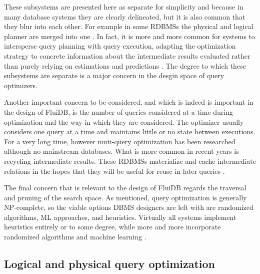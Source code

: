 These subsystems are presented here as separate for simplicity and
because in many database systems they are clearly delineated, but it is
also common that they blur into each other. For example in some RDBMSs
the physical and logical planner are merged into one
\cite{graefeCascadesFrameworkQuery1995,shankarQueryOptimizationMicrosoft2012,solimanOrcaModularQuery2014}. In
fact, it is more and more common for systems to intersperse query
planning with query execution, adapting the optimization strategy
\cite{graefeDynamicQueryEvaluation1989} to concrete information about
the intermediate results evaluated rather than purely relying on
estimations and predictions
\cite{dingPlanStitchHarnessing2018,chaudhuriPayasyougoFrameworkQuery2008,wuSamplingbasedQueryReoptimization2016,herodotouXplusSqltuningawareQuery2010}. The
degree to which these subsystems are separate is a major concern in
the desgin space of query optimizers.

Another important concern to be considered, and which is indeed is
important in the design of FluiDB, is the number of queries considered
at a time during optimization and the way in which they are
considered. The optimizer usually considers one query at a time and
maintains little or no state between executions. For a very long time,
however muti-query optimization has been researched
\cite{michiardiCachebasedMultiqueryOptimization2021,wangMultiqueryOptimizationMapreduce2013,royEfficientExtensibleAlgorithms2000,rogersMultiqueryOptimization2017}
although no mainstream databases. What is more common in recent years
is recycling intermediate results. These RDBMSs materialize and cache
intermediate relations in the hopes that they will be useful for reuse
in later queries
\cite{perezHistoryawareQueryOptimization2014,nagelRecyclingPipelinedQuery2013,ivanovaArchitectureRecyclingIntermediates2010}.

The final concern that is relevant to the design of FluiDB regards the
traversal and pruning of the search space. As mentioned, query
optimization is generally NP-complete, so the viable options DBMS
designers are left with are randomized algorithms, ML approaches, and
heuristics. Virtually all systems implement heuristics entirely or to
some degree, while more and more incorporate randomized algorithms
\cite{chandeGeneticOptimizationJoin2011} and machine learning
\cite{liMachineLearningDatabases2021,marcusNeoLearnedQuery2019}.

\subsection{Logical and physical query optimization}
\label{sec:org86152ae}

